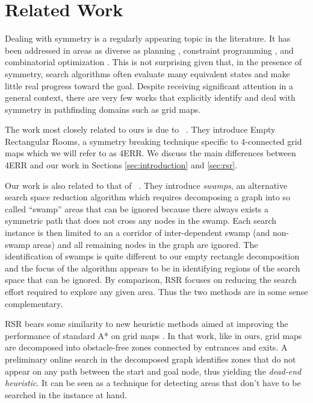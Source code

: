 \section{Related Work}
\label{sec:relatedwork}
Dealing with symmetry is a regularly appearing topic in the literature.  It has
been addressed in areas as diverse as planning \cite{fox99}, constraint programming
\cite{gent00}, and combinatorial optimization \cite{fukunaga08}.  This is not
surprising given that, in the presence of symmetry, search algorithms often
evaluate many equivalent states and make little real progress toward the goal.
Despite receiving significant attention in a general context, there are very few
works that explicitly identify and deal with symmetry in pathfinding domains 
such as grid maps. 
\par
The work most closely related to ours is due to
\citeauthor{harabor10}~.  They introduce Empty Rectangular
Rooms, a symmetry breaking technique specific to 4-connected grid maps which we
will refer to as 4ERR.  We discuss the main differences between 4ERR and our
work in Sections \ref{sec:introduction} and \ref{sec:rsr}.
\par
Our work is also related to that of
\citeauthor{pochter10}~.  They introduce \emph{swamps}, an
alternative search space reduction algorithm which requires decomposing a graph
into so called ``swamp'' areas that can be ignored because there always exists a
symmetric path that does not cross any nodes in the swamp.  Each search instance
is then limited to an a corridor of inter-dependent swamp (and non-swamp areas)
and all remaining nodes in the graph are ignored.  The identification of swamps
is quite different to our empty rectangle decomposition and the focus of the
algorithm appears to be in identifying regions of the search space that can be
ignored.  By comparison, RSR focuses on reducing the search effort required to
explore any given area.
Thus the two methods are in some sense complementary.
\par
RSR bears some similarity to new heuristic methods aimed at improving the
performance of standard A* on grid maps \cite{bjornsson06}.  In that work, like
in ours, grid maps are decomposed into obstacle-free zones connected by
entrances and exits.  A preliminary online search in the decomposed graph
identifies zones that do not appear on any path between the start and goal node,
thus yielding the \emph{dead-end heuristic}.  It can be seen as a technique for
detecting areas that don't have to be searched in the instance at hand.

